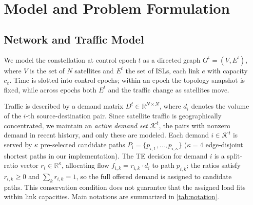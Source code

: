\section{Model and Problem Formulation}
\label{sec:formulation}


\subsection{Network and Traffic Model}
\label{sec:model}

We model the constellation at control epoch $t$ as a directed graph
$G^t = (V, E^t)$, where $V$ is the set of $N$ satellites and $E^t$ the set of
ISLs, each link $e$ with capacity $c_e$. Time is
slotted into control epochs; within an epoch the topology snapshot is fixed,
while across epochs both $E^t$ and the traffic change as satellites move.

Traffic is described by a demand matrix $D^t \in \mathbb{R}^{N \times N}$,
where $d_i$ denotes the volume of the $i$-th source-destination pair. Since
satellite traffic is geographically concentrated, we maintain an \emph{active
demand set} $\mathcal{K}^t$, the pairs with nonzero demand in recent
history, and only these are modeled. Each demand
$i \in \mathcal{K}^t$ is served by $\kappa$ pre-selected candidate paths
$P_i = \{p_{i,1}, \ldots, p_{i,\kappa}\}$ ($\kappa = 4$ edge-disjoint
shortest paths in our implementation). The TE decision for demand $i$ is a
split-ratio vector $r_i \in \mathbb{R}^{\kappa}$, allocating flow
$f_{i,k} = r_{i,k} \cdot d_i$ to path $p_{i,k}$; the ratios satisfy
$r_{i,k} \ge 0$ and $\sum_k r_{i,k} = 1$, so the full offered demand is
assigned to candidate paths. This conservation condition does not guarantee
that the assigned load fits within link capacities. Main notations are
summarized in \cref{tab:notation}.


